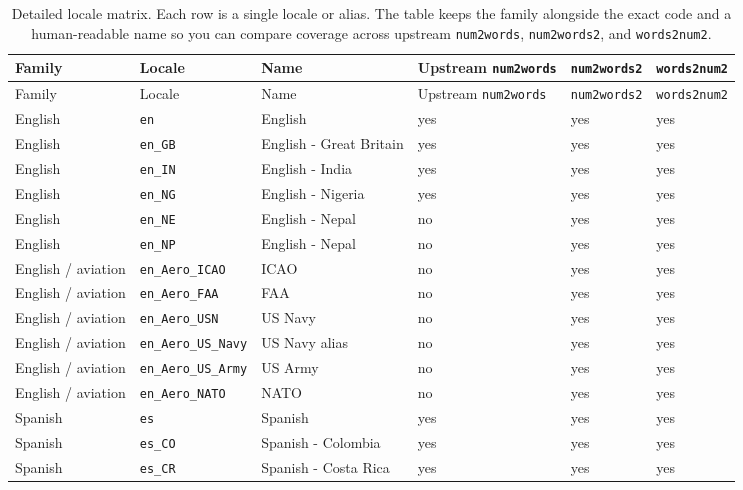 \documentclass{article}
\begin{document}
\begin{longtable}{>{\raggedright\arraybackslash}p{1.8cm} >{\raggedright\arraybackslash}p{2.0cm} >{\raggedright\arraybackslash}p{2.3cm} >{\raggedright\arraybackslash}p{1.2cm} >{\raggedright\arraybackslash}p{1.4cm} >{\raggedright\arraybackslash}p{1.4cm}}
\caption{Detailed locale matrix. Each row is a single locale or alias. The table keeps the family alongside the exact code and a human-readable name so you can compare coverage across upstream \texttt{num2words}, \texttt{num2words2}, and \texttt{words2num2}.}
\label{tab:locale-matrix}\\
\toprule
Family & Locale & Name & Upstream \texttt{num2words} & \texttt{num2words2} & \texttt{words2num2} \\
\midrule
\endfirsthead
\toprule
Family & Locale & Name & Upstream \texttt{num2words} & \texttt{num2words2} & \texttt{words2num2} \\
\midrule
\endhead
\bottomrule
\endfoot
English & \texttt{en} & English & yes & yes & yes \\
English & \texttt{en\_GB} & English - Great Britain & yes & yes & yes \\
English & \texttt{en\_IN} & English - India & yes & yes & yes \\
English & \texttt{en\_NG} & English - Nigeria & yes & yes & yes \\
English & \texttt{en\_NE} & English - Nepal & no & yes & yes \\
English & \texttt{en\_NP} & English - Nepal & no & yes & yes \\
English / aviation & \texttt{en\_Aero\_ICAO} & ICAO & no & yes & yes \\
English / aviation & \texttt{en\_Aero\_FAA} & FAA & no & yes & yes \\
English / aviation & \texttt{en\_Aero\_USN} & US Navy & no & yes & yes \\
English / aviation & \texttt{en\_Aero\_US\_Navy} & US Navy alias & no & yes & yes \\
English / aviation & \texttt{en\_Aero\_US\_Army} & US Army & no & yes & yes \\
English / aviation & \texttt{en\_Aero\_NATO} & NATO & no & yes & yes \\
Spanish & \texttt{es} & Spanish & yes & yes & yes \\
Spanish & \texttt{es\_CO} & Spanish - Colombia & yes & yes & yes \\
Spanish & \texttt{es\_CR} & Spanish - Costa Rica & yes & yes & yes \\

\end{longtable}
\end{document}
